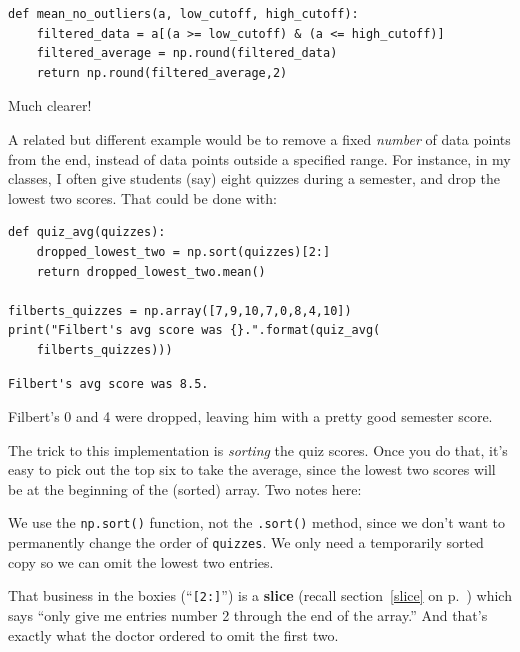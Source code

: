\begin{Verbatim}[fontsize=\footnotesize,samepage=true,frame=single,framesep=3mm]
def mean_no_outliers(a, low_cutoff, high_cutoff):
    filtered_data = a[(a >= low_cutoff) & (a <= high_cutoff)]
    filtered_average = np.round(filtered_data)
    return np.round(filtered_average,2)
\end{Verbatim}

Much clearer!

\medskip

A related but different example would be to remove a fixed \textit{number} of
data points from the end, instead of data points outside a specified range. For
instance, in my classes, I often give students (say) eight quizzes during a
semester, and drop the lowest two scores. That could be done with:


\begin{Verbatim}[fontsize=\footnotesize,samepage=true,frame=single,framesep=3mm]
def quiz_avg(quizzes):
    dropped_lowest_two = np.sort(quizzes)[2:]
    return dropped_lowest_two.mean()

filberts_quizzes = np.array([7,9,10,7,0,8,4,10])
print("Filbert's avg score was {}.".format(quiz_avg(
    filberts_quizzes)))
\end{Verbatim}
\vspace{-.2in}

\begin{Verbatim}[fontsize=\small,samepage=true,frame=leftline,framesep=5mm,framerule=1mm]
Filbert's avg score was 8.5.
\end{Verbatim}

Filbert's 0 and 4 were dropped, leaving him with a pretty good semester score.

The trick to this implementation is \textit{sorting} the quiz scores. Once you
do that, it's easy to pick out the top six to take the average, since the
lowest two scores will be at the beginning of the (sorted) array. Two notes
here:


\begin{compactitem}

\item We use the \texttt{np.sort()} function, not the \texttt{.sort()} method,
since we don't want to permanently change the order of \texttt{quizzes}. We
only need a temporarily sorted copy so we can omit the lowest two entries.


\item That business in the boxies (``\texttt{[2:]}'') is a \textbf{slice}
(recall section~\ref{slice} on p.~\pageref{slice}) which says ``only give me
entries number 2 through the end of the array.'' And that's exactly what the
doctor ordered to omit the first two.
\end{compactitem}

